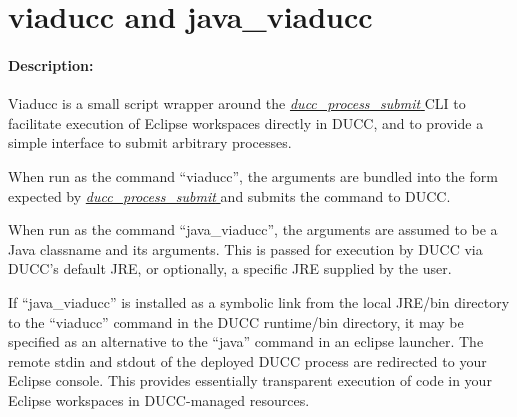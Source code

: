% 
% 
% 
% 
\ifpdf
\else
{}
\fi
    \section{viaducc and java\_viaducc}
    \label{sec:cli.viaducc}

    \paragraph{Description:}
        Viaducc is a small script wrapper around the \hyperref[sec:cli.ducc-process-submit]{\em
          ducc\_process\_submit } CLI to facilitate execution of Eclipse workspaces directly in DUCC,
        and to provide a simple interface to submit arbitrary processes.

        \begin{sloppypar}
          When run as the command ``viaducc'', the arguments are bundled into the form expected by
          \hyperref[sec:cli.ducc-process-submit]{\em ducc\_process\_submit } and submits the command
          to DUCC.
        \end{sloppypar}
        
        When run as the command ``java\_viaducc'', the arguments are assumed to be a Java classname
        and its arguments.  This is passed for execution by DUCC via DUCC's default JRE, or
        optionally, a specific JRE supplied by the user.

        If ``java\_viaducc'' is installed as a symbolic link from the local JRE/bin directory to the
        ``viaducc'' command in the DUCC runtime/bin directory, it may be specified as an alternative
        to the ``java'' command in an eclipse launcher.  The remote stdin and stdout of the deployed
        DUCC process are redirected to your Eclipse console.  This provides essentially transparent
        execution of code in your Eclipse workspaces in DUCC-managed resources.

